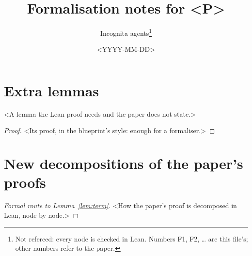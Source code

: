 \documentclass[11pt]{article}
\title{Formalisation notes for <P>}
\author{Incognita agents\thanks{Not refereed: every node is checked in Lean. Numbers F1, F2, \dots{}
  are this file's; other numbers refer to the paper.}}
\date{<YYYY-MM-DD>}
\begin{document}
\maketitle

\section{Extra lemmas}

\begin{lemma}\label{flem:example}
<A lemma the Lean proof needs and the paper does not state.>
\end{lemma}

\begin{proof}
<Its proof, in the blueprint's style: enough for a formaliser.>
\end{proof}

\section{New decompositions of the paper's proofs}

\begin{proof}[Formal route to Lemma~\ref{lem:term}]
<How the paper's proof is decomposed in Lean, node by node.>
\end{proof}
\end{document}
